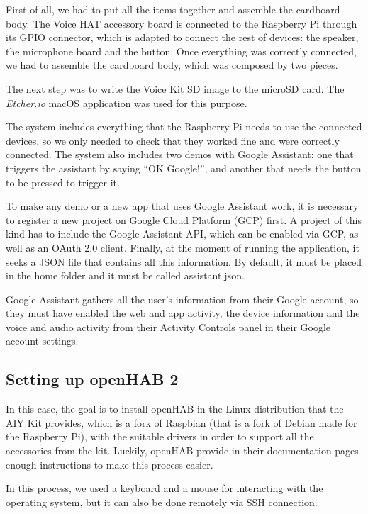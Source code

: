 First of all, we had to put all the items together and assemble the cardboard body. The Voice HAT accessory board is connected to the
Raspberry Pi through its GPIO connector, which is adapted to connect the rest of devices: the speaker, the microphone board and the
button. Once everything was correctly connected, we had to assemble the cardboard body, which was composed by two
pieces.\cite{aiyProjectsVoice}

The next step was to write the Voice Kit SD image\cite{voiceKitSdImage} to the microSD card. The \textit{Etcher.io} macOS application
was used for this purpose.

The system includes everything that the Raspberry Pi needs to use the connected devices, so we only needed to check that they worked
fine and were correctly connected. The system also includes two demos with Google Assistant: one that triggers the assistant by saying
“OK Google!”, and another that needs the button to be pressed to trigger it.

To make any demo or a new app that uses Google Assistant work, it is necessary to register a new project on Google Cloud Platform
(GCP) first. A project of this kind has to include the Google Assistant API, which can be enabled via GCP, as well as an OAuth 2.0
client. Finally, at the moment of running the application, it seeks a JSON file that contains all this information. By default, it
must be placed in the home folder and it must be called assistant.json.

Google Assistant gathers all the user’s information from their Google account, so they must have enabled the web and app activity,
the device information and the voice and audio activity from their Activity Controls panel in their Google account settings.

\subsection{Setting up openHAB 2}
In this case, the goal is to install openHAB in the Linux distribution that the AIY Kit provides, which is a fork of Raspbian
(that is a fork of Debian made for the Raspberry Pi), with the suitable drivers in order to support all the accessories from the kit.
Luckily, openHAB provide in their documentation pages\cite{openHABDocs} enough instructions to make this process easier.

In this process, we used a keyboard and a mouse for interacting with the operating system, but it can also be done remotely via
SSH connection.

